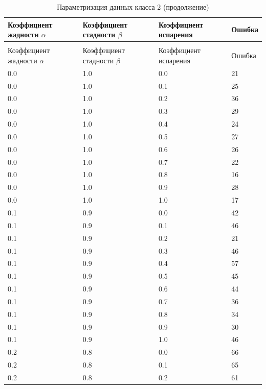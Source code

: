 \documentclass{bmstu}[a4paper]
\begin{document}
\begin{longtable}{|p{}|p{}|p{}|p{}|}
	\caption{Параметризация данных класса 2 (начало)}\label{tbl:b_log2}  \\\hline
	Коэффициент жадности $\alpha$ & Коэффициент стадности $\beta$ & Коэффициент испарения & Ошибка   \\\hline
	\endfirsthead
	
	\caption{Параметризация данных класса 2 (продолжение)}  \\\hline
	Коэффициент жадности $\alpha$ & Коэффициент стадности $\beta$ & Коэффициент испарения & Ошибка   \\\hline
	\endhead
	0.0 &  1.0 &  0.0 &    21 \\\hline
	0.0 &  1.0 &  0.1 &    25 \\\hline
	0.0 &  1.0 &  0.2 &    36 \\\hline
	0.0 &  1.0 &  0.3 &    29 \\\hline
	0.0 &  1.0 &  0.4 &    24 \\\hline
	0.0 &  1.0 &  0.5 &    27 \\\hline
	0.0 &  1.0 &  0.6 &    26 \\\hline
	0.0 &  1.0 &  0.7 &    22 \\\hline
	0.0 &  1.0 &  0.8 &    16 \\\hline
	0.0 &  1.0 &  0.9 &    28 \\\hline
	0.0 &  1.0 &  1.0 &    17 \\\hline
	0.1 &  0.9 &  0.0 &    42 \\\hline
	0.1 &  0.9 &  0.1 &    46 \\\hline
	0.1 &  0.9 &  0.2 &    21 \\\hline
	0.1 &  0.9 &  0.3 &    46 \\\hline
	0.1 &  0.9 &  0.4 &    57 \\\hline
	0.1 &  0.9 &  0.5 &    45 \\\hline
	0.1 &  0.9 &  0.6 &    44 \\\hline
	0.1 &  0.9 &  0.7 &    36 \\\hline
	0.1 &  0.9 &  0.8 &    34 \\\hline
	0.1 &  0.9 &  0.9 &    30 \\\hline
	0.1 &  0.9 &  1.0 &    46 \\\hline
	0.2 &  0.8 &  0.0 &    66 \\\hline
	0.2 &  0.8 &  0.1 &    65 \\\hline
	0.2 &  0.8 &  0.2 &    61 \\\hline

\end{longtable}
\end{document}

